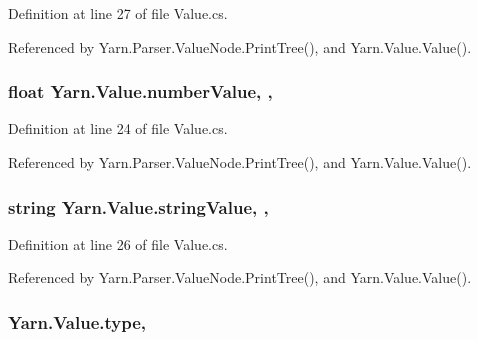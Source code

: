 Definition at line 27 of file Value.\-cs.



Referenced by Yarn.\-Parser.\-Value\-Node.\-Print\-Tree(), and Yarn.\-Value.\-Value().

\hypertarget{a00189_ae1892c1c7a8177537d1caa39a2e51da6}{
\subsubsection[{number\-Value}]{\setlength{\rightskip}{0pt plus 5cm}float Yarn.\-Value.\-number\-Value\hspace{0.3cm}{\ttfamily [get]}, {\ttfamily [set]}, {\ttfamily [package]}}}\label{a00189_ae1892c1c7a8177537d1caa39a2e51da6}


Definition at line 24 of file Value.\-cs.



Referenced by Yarn.\-Parser.\-Value\-Node.\-Print\-Tree(), and Yarn.\-Value.\-Value().

\hypertarget{a00189_add1b07146f1a9e4b655b33c93d07dff9}{
\subsubsection[{string\-Value}]{\setlength{\rightskip}{0pt plus 5cm}string Yarn.\-Value.\-string\-Value\hspace{0.3cm}{\ttfamily [get]}, {\ttfamily [set]}, {\ttfamily [package]}}}\label{a00189_add1b07146f1a9e4b655b33c93d07dff9}


Definition at line 26 of file Value.\-cs.



Referenced by Yarn.\-Parser.\-Value\-Node.\-Print\-Tree(), and Yarn.\-Value.\-Value().

\hypertarget{a00189_a6d5820fafa766911b9da84d1ed33e51a}{
\subsubsection[{type}]{ Yarn.\-Value.\-type\hspace{0.3cm}{\ttfamily [get]}, {\ttfamily [set]}}}\label{a00189_a6d5820fafa766911b9da84d1ed33e51a}


